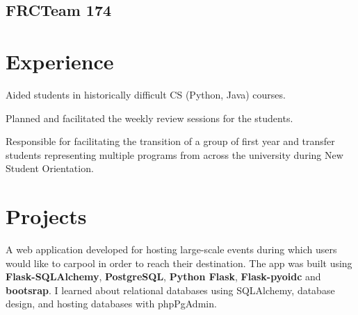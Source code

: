 \documentclass[]{deedy-resume-openfont}
\begin{document}
\begin{minipage}[t]{0.30\textwidth}
\vspace{\topsep} %

\subsection{FRC\textregistered Team 174}

\sectionsep

%
%

\end{minipage}
\hfill
\begin{minipage}[t]{0.66\textwidth}


\section{Experience}
\vspace{\topsep} %
\begin{tightemize}\item Aided students in historically difficult CS (Python, Java) courses.
  \item Planned and facilitated the weekly review sessions for the students.
\end{tightemize}
\sectionsep

\begin{tightemize}
\item Responsible for facilitating the transition of a group of first year and
transfer students representing multiple programs from across the
university during New Student Orientation.
\end{tightemize}
\sectionsep


\section{Projects}
A web application developed for hosting large-scale events during which users would like to carpool in order to reach their destination.
The app was built using \textbf{Flask-SQLAlchemy}, \textbf{PostgreSQL}, \textbf{Python Flask}, \textbf{Flask-pyoidc} and \textbf{bootsrap}.
I learned about relational databases using SQLAlchemy, database design, and hosting databases with phpPgAdmin.
\sectionsep


\end{minipage}
\end{document}
